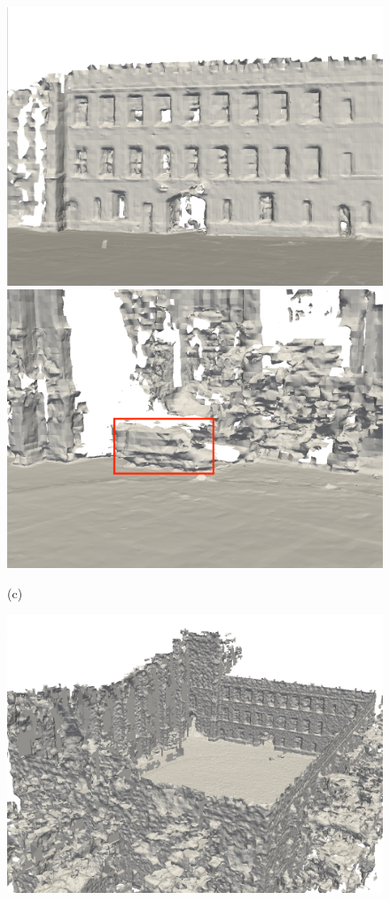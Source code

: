 \begin{figure}[htbp]
\begin{minipage}{0.322\linewidth}
    \includegraphics[width=1\linewidth]{figures/ncd_2_bce.png}
\end{minipage}\hfill
\begin{minipage}{0.322\linewidth}
    \centering
    \includegraphics[width=1\linewidth]{figures/ncd_1_bce.png}
\end{minipage}\vfill
(c)
\begin{minipage}{0.322\linewidth}
    \centering
    \includegraphics[width=1\linewidth]{figures/ncd_3_shine.png}

\end{minipage}
\end{figure}
